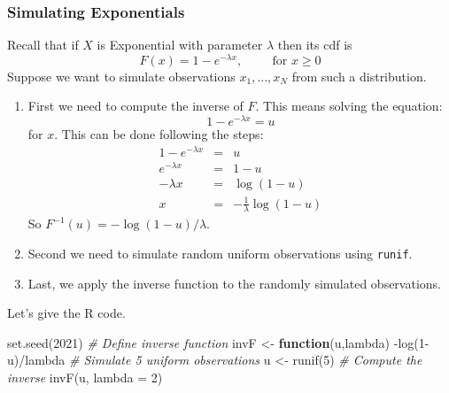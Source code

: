 \documentclass[
]{book}
\newenvironment{Shaded}{\begin{snugshade}}{\end{snugshade}}
\newcommand{\AttributeTok}[1]{\textcolor[rgb]{0.77,0.63,0.00}{#1}}
\newcommand{\CommentTok}[1]{\textcolor[rgb]{0.56,0.35,0.01}{\textit{#1}}}
\newcommand{\ControlFlowTok}[1]{\textcolor[rgb]{0.13,0.29,0.53}{\textbf{#1}}}
\newcommand{\DecValTok}[1]{\textcolor[rgb]{0.00,0.00,0.81}{#1}}
\newcommand{\FunctionTok}[1]{\textcolor[rgb]{0.00,0.00,0.00}{#1}}
\newcommand{\NormalTok}[1]{#1}
\newcommand{\OtherTok}[1]{\textcolor[rgb]{0.56,0.35,0.01}{#1}}
\newcommand{\SpecialCharTok}[1]{\textcolor[rgb]{0.00,0.00,0.00}{#1}}
\begin{document}
\hypertarget{simulating-exponentials}{%
\subsubsection{Simulating Exponentials}\label{simulating-exponentials}}

Recall that if \(X\) is Exponential with parameter \(\lambda\) then its cdf is
\[
F(x)= 1- e^{-\lambda x}, \hspace{1cm} \mbox{for } x\geq 0
\]
Suppose we want to simulate observations \(x_1,\dots,x_N\) from such a distribution.

\begin{enumerate}
\def\labelenumi{\arabic{enumi}.}
\item
  First we need to compute the inverse of \(F\). This means solving the equation:
  \[
  1-e^{-\lambda x} = u
  \]
  for \(x\). This can be done following the steps:
  \begin{eqnarray*}
  1-e^{-\lambda x} &=& u\\
  e^{-\lambda x} &=& 1 - u\\
  -\lambda x &=& \log(1-u)\\
  x &=& -\frac{1}{\lambda}\log(1-u)
  \end{eqnarray*}
  So \(F^{-1}(u)=-\log(1-u)/\lambda\).
\item
  Second we need to simulate random uniform observations using \texttt{runif}.
\item
  Last, we apply the inverse function to the randomly simulated observations.
\end{enumerate}

Let's give the R code.

\begin{Shaded}
\begin{Highlighting}[]
\FunctionTok{set.seed}\NormalTok{(}\DecValTok{2021}\NormalTok{)}
\CommentTok{\# Define inverse function}
\NormalTok{invF }\OtherTok{\textless{}{-}} \ControlFlowTok{function}\NormalTok{(u,lambda) }\SpecialCharTok{{-}}\FunctionTok{log}\NormalTok{(}\DecValTok{1}\SpecialCharTok{{-}}\NormalTok{u)}\SpecialCharTok{/}\NormalTok{lambda}
\CommentTok{\# Simulate 5 uniform observations}
\NormalTok{u }\OtherTok{\textless{}{-}} \FunctionTok{runif}\NormalTok{(}\DecValTok{5}\NormalTok{)}
\CommentTok{\# Compute the inverse }
\FunctionTok{invF}\NormalTok{(u, }\AttributeTok{lambda =} \DecValTok{2}\NormalTok{)}
\end{Highlighting}
\end{Shaded}
\end{document}
